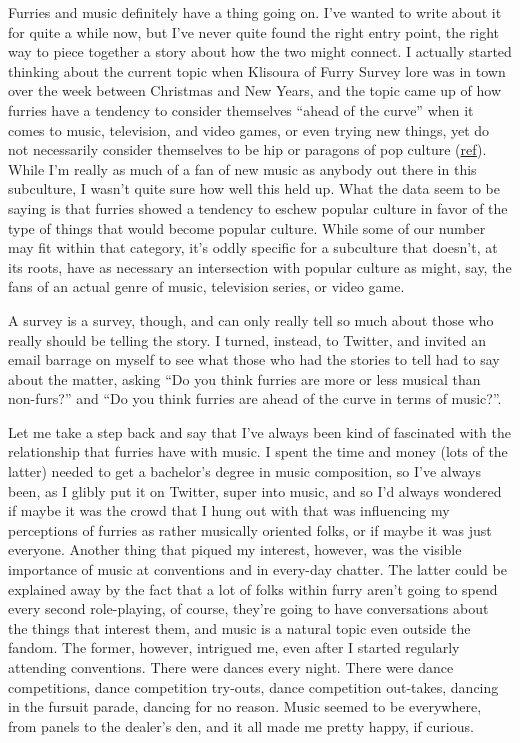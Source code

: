 Furries and music definitely have a thing going on. I've wanted to write
about it for quite a while now, but I've never quite found the right
entry point, the right way to piece together a story about how the two
might connect. I actually started thinking about the current topic when
Klisoura of Furry Survey lore was in town over the week between
Christmas and New Years, and the topic came up of how furries have a
tendency to consider themselves ``ahead of the curve'' when it comes to
music, television, and video games, or even trying new things, yet do
not necessarily consider themselves to be hip or paragons of pop culture
(\href{http://vis.adjectivespecies.com/microsurvey/2012/}{ref}). While
I'm really as much of a fan of new music as anybody out there in this
subculture, I wasn't quite sure how well this held up. What the data
seem to be saying is that furries showed a tendency to eschew popular
culture in favor of the type of things that would become popular
culture. While some of our number may fit within that category, it's
oddly specific for a subculture that doesn't, at its roots, have as
necessary an intersection with popular culture as might, say, the fans
of an actual genre of music, television series, or video game.

A survey is a survey, though, and can only really tell so much about
those who really should be telling the story. I turned, instead, to
Twitter, and invited an email barrage on myself to see what those who
had the stories to tell had to say about the matter, asking ``Do you
think furries are more or less musical than non-furs?'' and ``Do you
think furries are ahead of the curve in terms of music?''.

Let me take a step back and say that I've always been kind of fascinated
with the relationship that furries have with music. I spent the time and
money (lots of the latter) needed to get a bachelor's degree in music
composition, so I've always been, as I glibly put it on Twitter, super
into music, and so I'd always wondered if maybe it was the crowd that I
hung out with that was influencing my perceptions of furries as rather
musically oriented folks, or if maybe it was just everyone. Another
thing that piqued my interest, however, was the visible importance of
music at conventions and in every-day chatter. The latter could be
explained away by the fact that a lot of folks within furry aren't going
to spend every second role-playing, of course, they're going to have
conversations about the things that interest them, and music is a
natural topic even outside the fandom. The former, however, intrigued
me, even after I started regularly attending conventions. There were
dances every night. There were dance competitions, dance competition
try-outs, dance competition out-takes, dancing in the fursuit parade,
dancing for no reason. Music seemed to be everywhere, from panels to the
dealer's den, and it all made me pretty happy, if curious.

